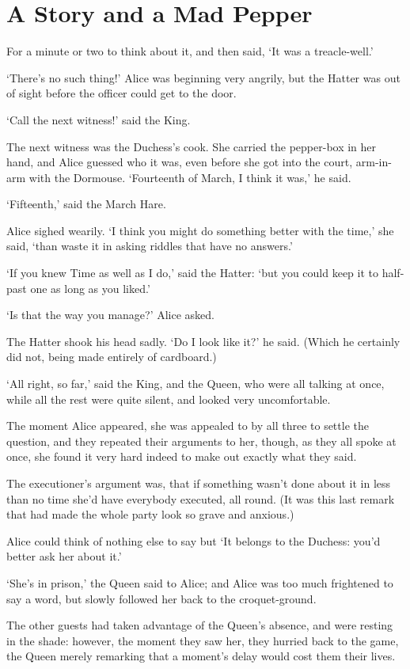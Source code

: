 \documentclass[statementpaper,twoside,openany]{memoir}
\begin{document}
\chapter{A Story and a Mad Pepper}

For a minute or two to think about it, and then said, `It was a treacle-well.'

`There's no such thing!' Alice was beginning very angrily, but the Hatter was out of sight before the officer could get to the door.

`Call the next witness!' said the King.

The next witness was the Duchess's cook. She carried the pepper-box in her hand, and Alice guessed who it was, even before she got into the court, arm-in-arm with the Dormouse. `Fourteenth of March, I think it was,' he said.

`Fifteenth,' said the March Hare.

Alice sighed wearily. `I think you might do something better with the time,' she said, `than waste it in asking riddles that have no answers.'

`If you knew Time as well as I do,' said the Hatter: `but you could keep it to half-past one as long as you liked.'

`Is that the way you manage?' Alice asked.

The Hatter shook his head sadly. `Do I look like it?' he said. (Which he certainly did not, being made entirely of cardboard.)

`All right, so far,' said the King, and the Queen, who were all talking at once, while all the rest were quite silent, and looked very uncomfortable.

The moment Alice appeared, she was appealed to by all three to settle the question, and they repeated their arguments to her, though, as they all spoke at once, she found it very hard indeed to make out exactly what they said.

The executioner's argument was, that if something wasn't done about it in less than no time she'd have everybody executed, all round. (It was this last remark that had made the whole party look so grave and anxious.)

Alice could think of nothing else to say but `It belongs to the Duchess: you'd better ask her about it.'

`She's in prison,' the Queen said to Alice; and Alice was too much frightened to say a word, but slowly followed her back to the croquet-ground.

The other guests had taken advantage of the Queen's absence, and were resting in the shade: however, the moment they saw her, they hurried back to the game, the Queen merely remarking that a moment's delay would cost them their lives.
\end{document}
